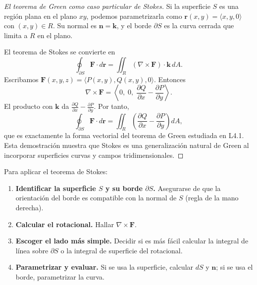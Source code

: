 \begin{proof}[El teorema de Green como caso particular de Stokes]
Si la superficie $S$ es una región plana en el plano $xy$, podemos parametrizarla como $\mathbf{r}(x,y)=\langle x,y,0\rangle$ con $(x,y)\in R$. Su normal es $\mathbf{n}=\mathbf{k}$, y el borde $\partial S$ es la curva cerrada que limita a $R$ en el plano. 
\par
El teorema de Stokes se convierte en
\[
\oint_{\partial S} \mathbf{F}\cdot d\mathbf{r}
=
\iint_R (\nabla\times\mathbf{F})\cdot\mathbf{k}\,dA.
\]
Escribamos $\mathbf{F}(x,y,z)=\langle P(x,y), Q(x,y), 0\rangle$. Entonces
\[
\nabla\times\mathbf{F}
=
\left\langle 0,\; 0,\; \frac{\partial Q}{\partial x}-\frac{\partial P}{\partial y} \right\rangle.
\]
El producto con $\mathbf{k}$ da $\frac{\partial Q}{\partial x}-\frac{\partial P}{\partial y}$. Por tanto,
\[
\oint_{\partial S} \mathbf{F}\cdot d\mathbf{r}
=
\iint_R \left( \frac{\partial Q}{\partial x}-\frac{\partial P}{\partial y} \right)dA,
\]
que es exactamente la forma vectorial del teorema de Green estudiada en L4.1. Esta demostración muestra que Stokes es una generalización natural de Green al incorporar superficies curvas y campos tridimensionales.
\end{proof}

\begin{pasos}
Para aplicar el teorema de Stokes:
\begin{enumerate}
\item \textbf{Identificar la superficie $S$ y su borde $\partial S$.} Asegurarse de que la orientación del borde es compatible con la normal de $S$ (regla de la mano derecha).
\item \textbf{Calcular el rotacional.} Hallar $\nabla\times\mathbf{F}$.
\item \textbf{Escoger el lado más simple.} Decidir si es más fácil calcular la integral de línea sobre $\partial S$ o la integral de superficie del rotacional.
\item \textbf{Parametrizar y evaluar.} Si se usa la superficie, calcular $dS$ y $\mathbf{n}$; si se usa el borde, parametrizar la curva.
\end{enumerate}
\end{pasos}

